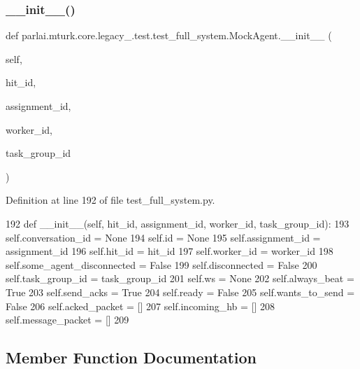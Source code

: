 \subsubsection{\texorpdfstring{\+\_\+\+\_\+init\+\_\+\+\_\+()}{\_\_init\_\_()}}
{\footnotesize\ttfamily def parlai.\+mturk.\+core.\+legacy\+\_.\+test.\+test\+\_\+full\+\_\+system.\+Mock\+Agent.\+\_\+\+\_\+init\+\_\+\+\_\+ (\begin{DoxyParamCaption}\item[{}]{self,  }\item[{}]{hit\+\_\+id,  }\item[{}]{assignment\+\_\+id,  }\item[{}]{worker\+\_\+id,  }\item[{}]{task\+\_\+group\+\_\+id }\end{DoxyParamCaption})}



Definition at line 192 of file test\+\_\+full\+\_\+system.\+py.


\begin{DoxyCode}
192     \textcolor{keyword}{def }\_\_init\_\_(self, hit\_id, assignment\_id, worker\_id, task\_group\_id):
193         self.conversation\_id = \textcolor{keywordtype}{None}
194         self.id = \textcolor{keywordtype}{None}
195         self.assignment\_id = assignment\_id
196         self.hit\_id = hit\_id
197         self.worker\_id = worker\_id
198         self.some\_agent\_disconnected = \textcolor{keyword}{False}
199         self.disconnected = \textcolor{keyword}{False}
200         self.task\_group\_id = task\_group\_id
201         self.ws = \textcolor{keywordtype}{None}
202         self.always\_beat = \textcolor{keyword}{True}
203         self.send\_acks = \textcolor{keyword}{True}
204         self.ready = \textcolor{keyword}{False}
205         self.wants\_to\_send = \textcolor{keyword}{False}
206         self.acked\_packet = []
207         self.incoming\_hb = []
208         self.message\_packet = []
209 
\end{DoxyCode}


\subsection{Member Function Documentation}
\mbox{\label{classparlai_1_1mturk_1_1core_1_1legacy__2018_1_1test_1_1test__full__system_1_1MockAgent_a70db268b46d8495b81f2640e53bab891}} 
